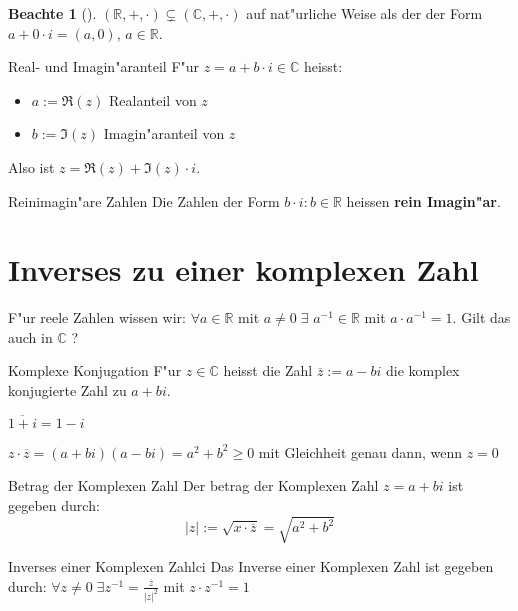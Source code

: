 \documentclass[oneside,fontsize=11pt,paper=a4,BCOR=0mm,DIV=12,automark,headsepline]{scrbook}
\theoremstyle{remark}
\theoremstyle{definition}
\newtheorem*{notte}{Beachte}
\theoremstyle{definition}
\theoremstyle{remark}
\begin{document}
\begin{notte}[]
  \((\mathbb{R},+,\cdot)\subsetneq (\mathbb{C},+,\cdot)\) auf nat"urliche Weise als
  der der Form \(a+0\cdot i = (a,0)\), \(a\in \mathbb{R}\).
\end{notte}

\begin{definition}{Real- und Imagin"aranteil}{}
  F"ur \(z=a+b\cdot i\in \mathbb{C}\) heisst:
  \begin{itemize}
  \item \(a:=\Re(z)\) Realanteil von \(z\)
  \item \(b:=\Im(z)\) Imagin"aranteil von \(z\)
  \end{itemize}

  Also ist \(z=\Re(z)+ \Im(z)\cdot i\).
\end{definition}

\begin{definition}{Reinimagin"are Zahlen}{}
  Die Zahlen der Form \(b\cdot i : b\in \mathbb{R}\) heissen \textbf{rein Imagin"ar}.
\end{definition}

\section{Inverses zu einer komplexen Zahl}
F"ur reele Zahlen wissen wir: \(\forall a\in \mathbb{R}\) mit \(a\not= 0\;\exists\)
\(a^{-1} \in \mathbb{R}\) mit \(a\cdot a^{-1}=1\). Gilt das auch in \(\mathbb{C}\) ?

\begin{definition}{Komplexe Konjugation}{}
  F"ur \(z\in \mathbb{C}\) heisst die Zahl \(\overline{z}:=a-bi\) die komplex
  konjugierte Zahl zu \(a+bi\).
\end{definition}

\begin{exa}
  \(\overline{1+i}=1-i\)
\end{exa}

\begin{relation}
  \(z\cdot\overline{z}=(a+bi)(a-bi)=a^2+b^2\geq 0\) mit Gleichheit genau dann,
  wenn \(z=0\)
\end{relation}

\begin{definition}{Betrag der Komplexen Zahl}{}
  Der betrag der Komplexen Zahl \(z=a+bi\) ist gegeben durch:
  \[|z|:=\sqrt{x\cdot \overline{z}}=\sqrt{a^2+b^2}\] 
\end{definition}

\label{sec:org0018acd}
\begin{definition}{Inverses einer Komplexen Zahl}{ci}
  Das Inverse einer Komplexen Zahl ist gegeben durch: \(\forall z\not= 0\; \exists z^{-1} = \frac{\overline{z}}{|z|^2}\) mit \(z \cdot z^{-1}=1\)
\end{definition}
\end{document}
